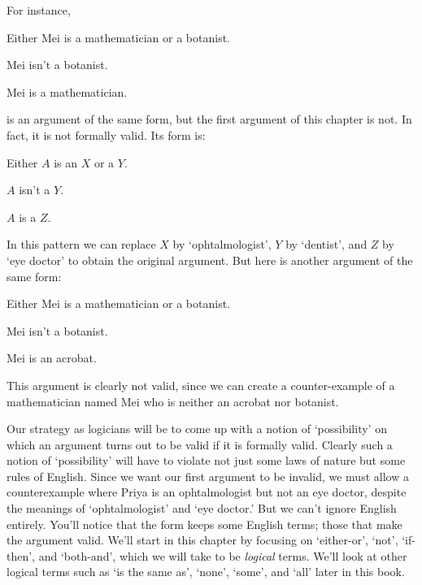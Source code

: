 \documentclass[PHIL101-Textbook.tex]{subfiles}
\begin{document}
\pagebreak
For instance,
\begin{earg}
	\item[] Either Mei is a mathematician or a botanist.
	\item[] Mei isn't a botanist.
	\item[\therefore] Mei is a mathematician.
\end{earg}
is an argument of the same form, but the first argument of this chapter is not. In fact, it is not formally valid. Its form is:
\begin{earg}
	\item[] Either $A$ is an $X$ or a $Y$.
	\item[] $A$ isn't a $Y$.
	\item[\therefore] $A$ is a $Z$.
\end{earg}
In this pattern we can replace $X$ by `ophtalmologist', $Y$ by `dentist', and $Z$ by `eye doctor' to obtain the original argument. But here is another argument of the same form:
\begin{earg}
	\item[] Either Mei is a mathematician or a botanist.
	\item[] Mei isn't a botanist.
	\item[\therefore] Mei is an acrobat.
\end{earg}
This argument is clearly not valid, since we can create a counter-example of a mathematician named Mei who is neither an acrobat nor botanist.

Our strategy as logicians will be to come up with a notion of `possibility' on which an argument turns out to be valid if it is formally valid. Clearly such a notion of `possibility' will have to violate not just some laws of nature but some rules of English. Since we want our first argument to be invalid, we must allow a counterexample where Priya is an ophtalmologist but not an eye doctor, despite the meanings of `ophtalmologist' and `eye doctor.'
But we can't ignore English entirely. You'll notice that the form keeps some English terms; those that make the argument valid. We'll start in this chapter by focusing on `either-or', `not', `if-then', and `both-and', which we will take to be \emph{logical} terms. 
We'll look at other logical terms such as `is the same as', `none', `some', and `all' later in this book.
\end{document}
